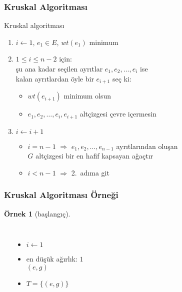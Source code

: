 \documentclass[dvipsnames]{beamer}
\theoremstyle{definition}
\theoremstyle{example}
\newtheorem{ornek}[theorem]{Örnek}
\theoremstyle{plain}
\begin{document}
\begin{frame}
  \frametitle{Kruskal Algoritması}

  \begin{block}{Kruskal algoritması}
    \begin{enumerate}
      \item $i \leftarrow 1$, $e_1 \in E$, $wt(e_1)$ minimum

      \pause
      \item $1 \leq i \leq n-2$ için:\\
        şu ana kadar seçilen ayrıtlar $e_1,e_2,\dots,e_i$ ise\\
        kalan ayrıtlardan öyle bir $e_{i+1}$ seç ki:
      \begin{itemize}
        \item $wt(e_{i+1})$ minimum olsun
        \item $e_1,e_2,\dots,e_i,e_{i+1}$ altçizgesi çevre içermesin
      \end{itemize}

      \pause
      \item $i \leftarrow i+1$
      \begin{itemize}
        \item $i=n-1$ $\Rightarrow$ $e_1,e_2,\dots,e_{n-1}$ ayrıtlarından oluşan\\
          $G$ altçizgesi bir en hafif kapsayan ağaçtır
        \item $i<n-1$ $\Rightarrow$ 2.~adıma git
      \end{itemize}
    \end{enumerate}
  \end{block}
\end{frame}

\begin{frame}
  \frametitle{Kruskal Algoritması Örneği}

  \begin{ornek}[başlangıç]
    \begin{columns}
      \begin{center}
      \end{center}

      \pause
      \begin{itemize}
        \item $i \leftarrow 1$
        \item en düşük ağırlık: $1$\\
          $(e,g)$

        \pause
        \item $T = \{ (e,g) \}$
      \end{itemize}
    \end{columns}
  \end{ornek}
\end{frame}
\end{document}

